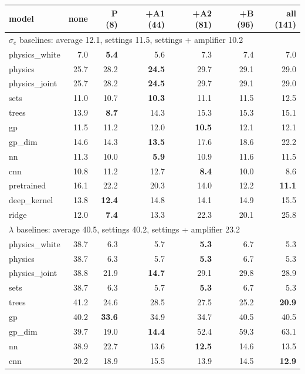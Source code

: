 \begin{tabular}{lrrrrrr}
\toprule
model & none & P (8) & +A1 (44) & +A2 (81) & +B (96) & all (141) \\
\midrule
\multicolumn{7}{l}{\textbf{$\sigma_e$} \quad baselines: average 12.1, settings 11.5, settings + amplifier 10.2} \\ \midrule
physics\_white & 7.0 & \textbf{5.4} & 5.6 & 7.3 & 7.4 & 7.0 \\
physics & 25.7 & 28.2 & \textbf{24.5} & 29.7 & 29.1 & 29.0 \\
physics\_joint & 25.7 & 28.2 & \textbf{24.5} & 29.7 & 29.1 & 29.0 \\
sets & 11.0 & 10.7 & \textbf{10.3} & 11.1 & 11.5 & 12.5 \\
trees & 13.9 & \textbf{8.7} & 14.3 & 15.3 & 15.3 & 15.1 \\
gp & 11.5 & 11.2 & 12.0 & \textbf{10.5} & 12.1 & 12.1 \\
gp\_dim & 14.6 & 14.3 & \textbf{13.5} & 17.6 & 18.6 & 22.2 \\
nn & 11.3 & 10.0 & \textbf{5.9} & 10.9 & 11.6 & 11.5 \\
cnn & 10.8 & 11.2 & 12.7 & \textbf{8.4} & 10.0 & 8.6 \\
pretrained & 16.1 & 22.2 & 20.3 & 14.0 & 12.2 & \textbf{11.1} \\
deep\_kernel & 13.8 & \textbf{12.4} & 14.8 & 14.1 & 14.9 & 15.5 \\
ridge & 12.0 & \textbf{7.4} & 13.3 & 22.3 & 20.1 & 25.8 \\
\midrule
\multicolumn{7}{l}{\textbf{$\lambda$} \quad baselines: average 40.5, settings 40.2, settings + amplifier 23.2} \\ \midrule
physics\_white & 38.7 & 6.3 & 5.7 & \textbf{5.3} & 6.7 & 5.3 \\
physics & 38.7 & 6.3 & 5.7 & \textbf{5.3} & 6.7 & 5.3 \\
physics\_joint & 38.8 & 21.9 & \textbf{14.7} & 29.1 & 29.8 & 28.9 \\
sets & 38.7 & 6.3 & 5.7 & \textbf{5.3} & 6.7 & 5.3 \\
trees & 41.2 & 24.6 & 28.5 & 27.5 & 25.2 & \textbf{20.9} \\
gp & 40.2 & \textbf{33.6} & 34.9 & 34.7 & 40.5 & 40.5 \\
gp\_dim & 39.7 & 19.0 & \textbf{14.4} & 52.4 & 59.3 & 63.1 \\
nn & 38.9 & 22.7 & 13.6 & \textbf{12.5} & 14.6 & 13.5 \\
cnn & 20.2 & 18.9 & 15.5 & 13.9 & 14.5 & \textbf{12.9} \\

\end{tabular}
